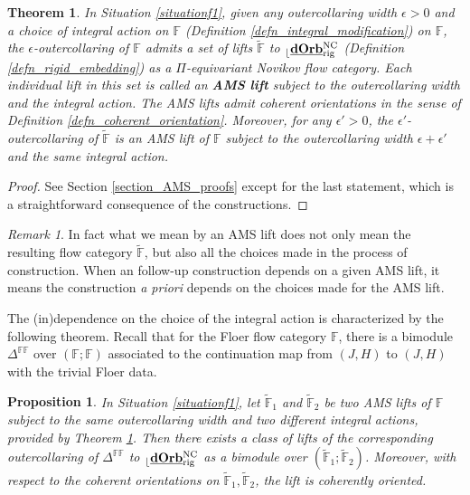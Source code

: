 \documentclass[reqno, 10pt]{amsart}
\numberwithin{equation}{section}
\numberwithin{equation}{section}
\newtheorem{thma}{Theorem}
\newtheorem{prop}[thm]{Proposition}
\theoremstyle{definition}
\theoremstyle{remark}
\newtheorem{rem}[thm]{Remark}
\newcommand{\mb}{\mathbb}
\renewcommand{\outer}{{}_{\lfloor}}
\newcommand{\uds}[1]{\underline{\smash{#1}}}
\begin{document}
\begin{thma}\label{thma_flow_chart}
In Situation \ref{situationf1}, given any outercollaring width $\epsilon>0$ and a choice of integral action on ${\mb F}$ (Definition \ref{defn_integral_modification}) on ${\mb F}$, the $\epsilon$-outercollaring of ${\mb F}$ admits a set of lifts $\tilde {\mb F}$ to $\outer \uds{\bf dOrb}^{\rm NC}_{\rm rig}$ (Definition \ref{defn_rigid_embedding}) as a $\Pi$-equivariant Novikov flow category. Each individual lift in this set is called an {\bf AMS lift} subject to the outercollaring width and the integral action. The AMS lifts admit coherent orientations in the sense of Definition \ref{defn_coherent_orientation}. Moreover, for any $\epsilon'>0$, the $\epsilon'$-outercollaring of $\tilde {\mb F}$ is an AMS lift of ${\mb F}$ subject to the outercollaring width $\epsilon + \epsilon'$ and the same integral action. 
\end{thma}

\begin{proof}
See Section \ref{section_AMS_proofs} except for the last statement, which is a straightforward consequence of the constructions.
\end{proof}

\begin{rem}
In fact what we mean by an AMS lift does not only mean the resulting flow category $\tilde {\mb F}$, but also all the choices made in the process of construction. When an follow-up construction depends on a given AMS lift, it means the construction {\it a priori} depends on the choices made for the AMS lift. 
\end{rem}



The (in)dependence on the choice of the integral action is characterized by the following theorem. Recall that for the Floer flow category ${\mb F}$, there is a bimodule $\mb{\Delta}^{\mb{FF}}$ over $({\mb F}; {\mb F})$ associated to the continuation map from $(J, H)$ to $(J, H)$ with the trivial Floer data.

\begin{prop}\label{thm_integral_action_comparison}
In Situation \ref{situationf1}, let $\tilde {\mb F}_1$ and $\tilde {\mb F}_2$ be two AMS lifts of ${\mb F}$ subject to the same outercollaring width and two different integral actions, provided by Theorem \ref{thma_flow_chart}. Then there exists a class of lifts of the corresponding outercollaring of $\mb{\Delta}^{\mb{FF}}$ to $\outer \uds{\bf dOrb}_{\rm rig}^{\rm NC}$ as a bimodule over $(\tilde {\mb F}_1; \tilde {\mb F}_2)$. Moreover, with respect to the coherent orientations on $\tilde {\mb F}_1, \tilde {\mb F}_2$, the lift is coherently oriented. %
\end{prop}
\end{document}
